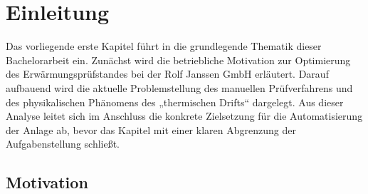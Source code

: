 
\section{Einleitung}
\label{chap:einleitung}
Das vorliegende erste Kapitel führt in die grundlegende Thematik dieser Bachelorarbeit ein. Zunächst wird die betriebliche Motivation zur Optimierung des Erwärmungsprüfstandes bei der Rolf Janssen GmbH erläutert. Darauf aufbauend wird die aktuelle Problemstellung des manuellen Prüfverfahrens und des physikalischen Phänomens des „thermischen Drifts“ dargelegt. Aus dieser Analyse leitet sich im Anschluss die konkrete Zielsetzung für die Automatisierung der Anlage ab, bevor das Kapitel mit einer klaren Abgrenzung der Aufgabenstellung schließt.

\subsection{Motivation}
\label{sec:motivation}




